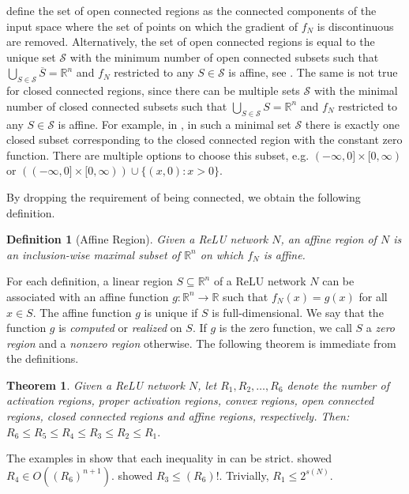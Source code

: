\documentclass{article}
\newtheorem{theorem}{Theorem}[section]
\newtheorem{definition}{Definition}
\begin{document}
\citet{hanin2019deep} define the set of open connected regions as the connected components of the input space where the set of points on which the gradient of $f_N$ is discontinuous are removed.
Alternatively, the set of open connected regions is equal to the unique set $\mathcal{S}$ with the minimum number of open connected subsets such that $\bigcup_{S\in \mathcal{S}}\overline{S}=\mathbb{R}^n$ and $f_N$ restricted to any $S\in \mathcal{S}$ is affine, see .
The same is not true for closed connected regions, since there can be multiple sets $\mathcal{S}$ with the minimal number of closed connected subsets such that $\bigcup_{S\in \mathcal{S}}S=\mathbb{R}^n$ and $f_N$ restricted to any $S\in \mathcal{S}$ is affine. For example, in , in such a minimal set $\mathcal{S}$ there is exactly one closed subset corresponding to the closed connected region with the constant zero function. There are multiple options to choose this subset, e.g. $(-\infty, 0] \times [0,\infty)$ or $((-\infty, 0] \times [0,\infty)) \cup \{(x,0):x>0\}$.

By dropping the requirement of being connected, we obtain the following definition.
\begin{definition}[Affine Region]
\label{def:region6}
    Given a ReLU network $N$, an \emph{affine region} of $N$ is an inclusion-wise maximal subset of $\mathbb{R}^n$ on which $f_N$ is affine.
\end{definition}

For each definition, a linear region $S\subseteq \mathbb{R}^n$ of a ReLU network $N$ can be associated with an affine function $g:\mathbb{R}^n\to \mathbb{R}$ such that $f_N(x)=g(x)$ for all $x\in S$.
The affine function $g$ is unique if $S$ is full-dimensional.
We say that the function $g$ is \emph{computed} or \emph{realized} on $S$.
If $g$ is the zero function, we call $S$ a \emph{zero region} and a \emph{nonzero region} otherwise. The following theorem is immediate from the definitions.
\begin{theorem}
\label{thm:region_hierarchy}
    Given a ReLU network $N$, let $R_1, R_2,\dots,R_6$ denote the number of activation regions, proper activation regions, convex regions, open connected regions, closed connected regions and affine regions, respectively.
    Then:\quad
    $
    R_6 \leq R_5 \leq R_4 \leq R_3 \leq R_2 \leq R_1.
    $
\end{theorem}

The examples in  show that each inequality in  can be strict.
\citet{zanotti2025bounds} showed $R_4\in O((R_6)^{n+1})$.
\citet{he2018relu} showed $R_3\leq (R_6)!$.
Trivially, $R_1\leq 2^{s(N)}$.
\end{document}
